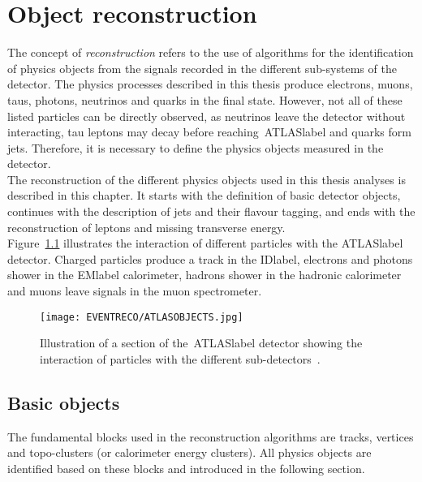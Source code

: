 \chapter{Object reconstruction}
\label{chapter:EventReco}

The concept of \textit{reconstruction} refers to the use of algorithms for the identification of physics objects from the signals recorded in the different sub-systems of the detector. The physics processes described in this thesis produce electrons, muons, taus, photons, neutrinos and quarks in the final state. However, not all of these listed particles can be directly observed, as neutrinos leave the detector without interacting, tau leptons may decay before reaching~\acrshort{ATLASlabel} and quarks form jets. Therefore, it is necessary to define the physics objects measured in the detector.\\

The reconstruction of the different physics objects used in this thesis analyses is described in this chapter. It starts with the definition of basic detector objects, continues with the description of jets and their flavour tagging, and ends with the reconstruction of leptons and missing transverse energy.\\

Figure~\ref{figEVNTRECO:ATLASOBJECTS} illustrates the interaction of different particles with the \acrshort{ATLASlabel} detector. Charged particles produce a track in the \acrshort{IDlabel}, electrons and photons shower in the \acrshort{EMlabel} calorimeter, hadrons shower in the hadronic calorimeter and muons leave signals in the muon spectrometer.

\begin{figure}[htbp]
     \RawFloats
     \begin{center}
     \texttt{[image: EVENTRECO/ATLASOBJECTS.jpg]}
     \caption{
         Illustration of a section of the~\acrshort{ATLASlabel} detector showing the interaction of particles with the different sub-detectors~\cite{Pequenao:1505342}. 
     }
     \label{figEVNTRECO:ATLASOBJECTS}
     \end{center}
 \end{figure}

\clearpage

\section{Basic objects}

The fundamental blocks used in the reconstruction algorithms are tracks, vertices and topo-clusters (or calorimeter energy clusters). All physics objects are identified based on these blocks and introduced in the following section.

